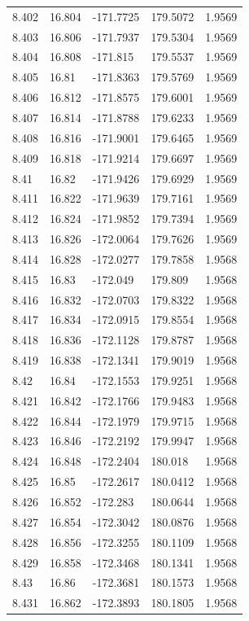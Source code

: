 \begin{tabular}{lllll}
8.402 & 16.804 & -171.7725 & 179.5072 & 1.9569 \\
8.403 & 16.806 & -171.7937 & 179.5304 & 1.9569 \\
8.404 & 16.808 & -171.815 & 179.5537 & 1.9569 \\
8.405 & 16.81 & -171.8363 & 179.5769 & 1.9569 \\
8.406 & 16.812 & -171.8575 & 179.6001 & 1.9569 \\
8.407 & 16.814 & -171.8788 & 179.6233 & 1.9569 \\
8.408 & 16.816 & -171.9001 & 179.6465 & 1.9569 \\
8.409 & 16.818 & -171.9214 & 179.6697 & 1.9569 \\
8.41 & 16.82 & -171.9426 & 179.6929 & 1.9569 \\
8.411 & 16.822 & -171.9639 & 179.7161 & 1.9569 \\
8.412 & 16.824 & -171.9852 & 179.7394 & 1.9569 \\
8.413 & 16.826 & -172.0064 & 179.7626 & 1.9569 \\
8.414 & 16.828 & -172.0277 & 179.7858 & 1.9568 \\
8.415 & 16.83 & -172.049 & 179.809 & 1.9568 \\
8.416 & 16.832 & -172.0703 & 179.8322 & 1.9568 \\
8.417 & 16.834 & -172.0915 & 179.8554 & 1.9568 \\
8.418 & 16.836 & -172.1128 & 179.8787 & 1.9568 \\
8.419 & 16.838 & -172.1341 & 179.9019 & 1.9568 \\
8.42 & 16.84 & -172.1553 & 179.9251 & 1.9568 \\
8.421 & 16.842 & -172.1766 & 179.9483 & 1.9568 \\
8.422 & 16.844 & -172.1979 & 179.9715 & 1.9568 \\
8.423 & 16.846 & -172.2192 & 179.9947 & 1.9568 \\
8.424 & 16.848 & -172.2404 & 180.018 & 1.9568 \\
8.425 & 16.85 & -172.2617 & 180.0412 & 1.9568 \\
8.426 & 16.852 & -172.283 & 180.0644 & 1.9568 \\
8.427 & 16.854 & -172.3042 & 180.0876 & 1.9568 \\
8.428 & 16.856 & -172.3255 & 180.1109 & 1.9568 \\
8.429 & 16.858 & -172.3468 & 180.1341 & 1.9568 \\
8.43 & 16.86 & -172.3681 & 180.1573 & 1.9568 \\
8.431 & 16.862 & -172.3893 & 180.1805 & 1.9568 \\

\end{tabular}
